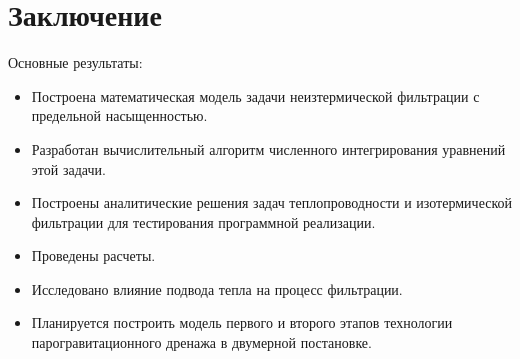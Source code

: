 \documentclass[12pt,a4paper]{article}
\begin{document}
\section{Заключение}
Основные результаты:
\begin{itemize}
\item Построена математическая модель задачи неизтермической фильтрации с предельной насыщенностью.
\item Разработан вычислительный алгоритм численного интегрирования уравнений этой задачи.
\item Построены аналитические решения задач теплопроводности и изотермической фильтрации для тестирования программной реализации.
\item Проведены расчеты.
\item Исследовано влияние подвода тепла на процесс фильтрации.
\item Планируется построить модель первого и второго этапов технологии парогравитационного дренажа в двумерной постановке.
\end{itemize}
\newpage
 
 
\end{document}
